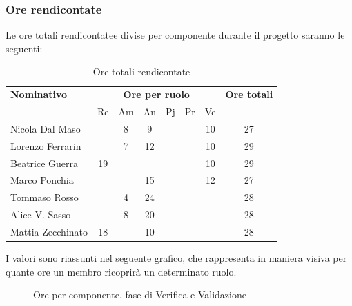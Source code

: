 \subsubsection{Ore rendicontate}
Le ore totali rendicontatee divise per componente durante il progetto saranno le seguenti:

\begin{table}[H]
	\centering
	\begin{tabular}{|l|c|c|c|c|c|c|c|}
		\hline
		\textbf{Nominativo} & 
		\multicolumn{6}{c|}{\textbf{Ore per ruolo}} & 
		\textbf{Ore totali} \\
		& Re & Am & An & Pj & Pr & Ve & \\
		\hline
		Nicola Dal Maso & & 8 & 9 & & & 10 & 27 \\
		Lorenzo Ferrarin & & 7 & 12 & & & 10 & 29 \\
		Beatrice Guerra & 19 & & & & & 10 & 29 \\
		Marco Ponchia & & & 15 & & & 12 & 27 \\
		Tommaso Rosso & & 4 & 24 & & & & 28 \\
		Alice V. Sasso & & 8 & 20 & & & & 28 \\
		Mattia Zecchinato & 18 & & 10 & & & & 28 \\
		\hline
	\end{tabular}
	\caption{Ore totali rendicontate}
\end{table}
I valori sono riassunti nel seguente grafico, che rappresenta in maniera visiva per quante ore un membro ricoprirà un determinato ruolo.
\begin{figure}[H]
	\centering
	\caption{Ore per componente, fase di Verifica e Validazione}
\end{figure}






